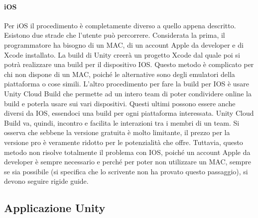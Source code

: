 \paragraph{iOS}
Per iOS il procedimento è completamente diverso a quello appena descritto. Esistono due strade che l’utente può percorrere.
Considerata la prima, il programmatore ha bisogno di un MAC, di un account Apple da developer e di Xcode installato. La build di Unity creerà un progetto Xcode dal quale poi si potrà realizzare una build per il dispositivo IOS. Questo metodo è complicato per chi non dispone di un MAC, poiché le alternative sono degli emulatori della piattaforma o cose simili.
L’altro procedimento per fare la build per IOS è usare Unity Cloud Build che permette ad un intero team di poter condividere online la build e poterla usare sui vari dispositivi. Questi ultimi possono essere anche diversi da IOS, essendoci una build per ogni piattaforma interessata. Unity Cloud Build va, quindi, incontro e facilita le interazioni tra i membri di un team. Si osserva che sebbene la versione gratuita è molto limitante, il prezzo per la versione pro è veramente ridotto per le potenzialità che offre. Tuttavia, questo metodo non risolve totalmente il problema con IOS, poiché un account Apple da developer è sempre necessario e perché per poter non utilizzare un MAC, sempre se sia possibile (si specifica che lo scrivente non ha provato questo passaggio), si devono seguire rigide guide.


\subsection{Applicazione Unity}
